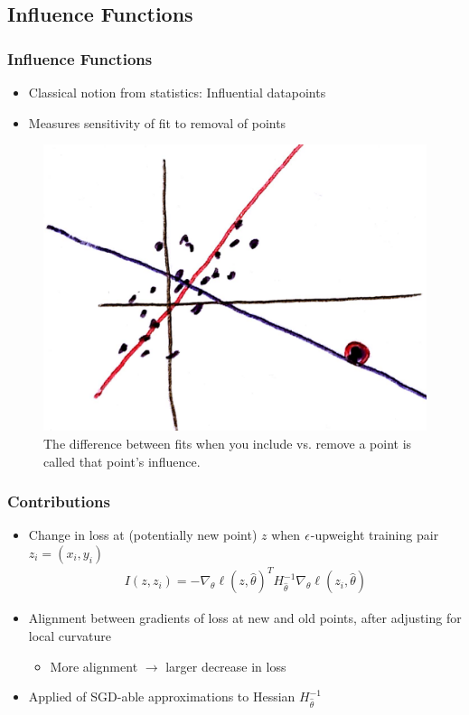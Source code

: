 \documentclass[10pt,mathserif]{beamer}
\begin{document}
\subsection{Influence Functions}

\begin{frame}
  \frametitle{Influence Functions}
  \begin{itemize}
  \item Classical notion from statistics: Influential datapoints
  \item Measures sensitivity of fit to removal of points
  \end{itemize} 
  \begin{figure}[ht]
    \centering
    \includegraphics[width=0.7\paperwidth]{figure/classical_influence}
    \caption{The difference between fits when you include vs. remove a point is
      called that point's influence.\label{fig:classical_influence} }
\end{figure}
\end{frame}

\begin{frame}
  \frametitle{Contributions}
  \begin{itemize}
  \item Change in loss at (potentially new point) $z$ when $\epsilon$-upweight
    training pair $z_i = \left(x_i, y_i\right)$
    \begin{align*}
    I\left(z, z_i\right) = -\nabla_{\theta} \ell\left(z, \hat{\theta}\right)^{T} H^{-1}_{\hat{\theta}} \nabla_{\theta} \ell\left(z_i, \hat{\theta}\right)
    \end{align*}
  \item Alignment between gradients of loss at new and old points, after
    adjusting for local curvature 
    \begin{itemize}
    \item More alignment $\rightarrow$ larger decrease in loss
    \end{itemize}
  \item Applied of SGD-able approximations to Hessian $H^{-1}_{\hat{\theta}}$
  \end{itemize}
\end{frame}
\end{document}
